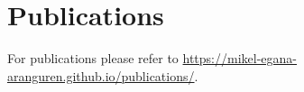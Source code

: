 \documentclass[11pt,fullpage]{article}
\begin{document}
\section*{Publications}

For publications please refer to \href{https://mikel-egana-aranguren.github.io/publications/}{https://mikel-egana-aranguren.github.io/publications/}.





\end{document}
